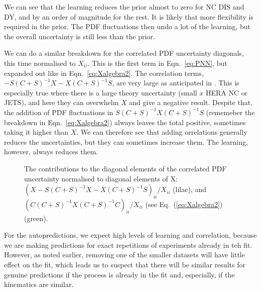 We can see that the learning reduces the prior almost to zero for NC DIS and DY, and by an order of magnitude for the rest. It is likely that more flexibility is required in the prior. The PDF fluctuations then undo a lot of the learning, but the overall uncertainty is still less than the prior.

We can do a similar breakdown for the correlated PDF uncertainty diagonals, this time normalised to $X_{ii}$. This is the first term in Eqn.~\ref{eq:PNN}, but expanded out like in Eqn.~\ref{eq:Xalgebra2}. The correlation terms, $-S(C+S)^{-1}X-X(C+S)^{-1}S$, are very large as anticipated in \cite{Harland-Lang:2018bxd}. This is especially true where there is a large theory uncertainty (small $x$ HERA NC or JETS), and here they can overwhelm $X$ and give a negative result. Despite that, the addition of PDF fluctuations in $S(C+S)^{-1}X(C+S)^{-1}S$ (rememeber the breakdown in Eqn.~\ref{eq:Xalgebra2}) always leaves the total positive, sometimes taking it higher than $X$. We can therefore see that adding orrelations generally reduces the uncertainties, but they can sometimes increase them. The learning, however, always reduces them.
\begin{figure}[H]
    \begin{center}
    \end{center}
  \vspace{-0.55cm}
  \caption{The contributions to the diagonal elements of the correlated PDF uncertainty normalised to diagonal elements of X: $(X-S(C+S)^{-1}X-X(C+S)^{-1}S)_{ii}/X_{ii}$ (lilac), and  $(C(C+S)^{-1}X(C+S)^{-1}C )_{ii}/X_{ii}$  (see Eq.~(\ref{eq:Xalgebra2}) (green).}
  \label{fig:Xcpts}
\end{figure}
For the autopredictions, we expect high levels of learning and correlation, because we are making predictions for exact repetitions of experiments already in teh fit. However, as noted earlier, removing one of the smaller datasets will have little effect on the fit, which leads us to suspect that there will be similar results for genuine predictions if the process is already in the fit and, especially, if the kinematics are similar.

